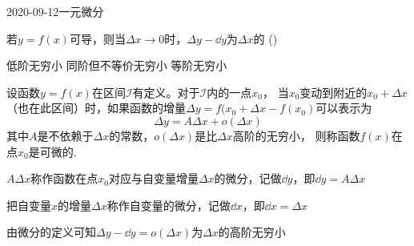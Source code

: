 \documentclass{ctexart}
\begin{document}
\begin{mathques}{2020-09-12}{一元微分}
\begin{ques}
  若$y = f(x)$可导，则当$\Delta x \to 0$时，$\Delta y - \dd y$为$\Delta x$的
  (\quad)
  \begin{multichoice}
    \task {}
    \task 低阶无穷小
    \task 同阶但不等价无穷小
    \task 等阶无穷小
  \end{multichoice}
\end{ques}
\begin{solu}
  \begin{mathideabox}[微分定义]
    设函数$y = f(x)$在区间$\mathcal{I}$有定义。对于$\mathcal{I}$内的一点$x_0$，
    当$x_0$变动到附近的$x_0 + \Delta x$（也在此区间）时，如果函数的增量$\Delta
    y = f(x_0 + \Delta x - f(x_0)$可以表示为
    \[
      \Delta y = A\Delta x + o(\Delta x)
    \]
    其中$A$是不依赖于$\Delta x$的常数，$o(\Delta x)$是比$\Delta x$高阶的无穷小，
    则称函数$f(x)$在点$x_0$是可微的.

    $A\Delta x$称作函数在点$x_0$对应与自变量增量$\Delta x$的微分，记做$\dd
    y$，即$\dd y = A\Delta x$

    把自变量$x$的增量$\Delta x$称作自变量的微分，记做$\dd x$，即$\dd x =
    \Delta x$
  \end{mathideabox}
  由微分的定义可知$\Delta y - \dd y = o(\Delta x)$为$\Delta x$的高阶无穷小
\end{solu}
\end{mathques}
\end{document}
